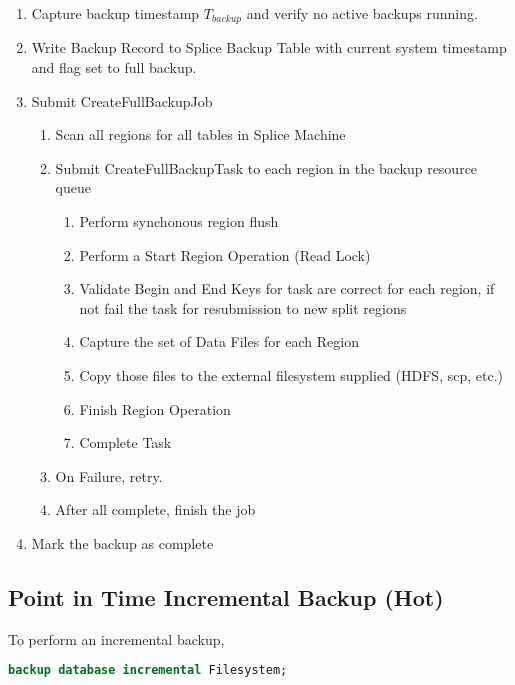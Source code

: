 \begin{enumerate}
	\item Capture backup timestamp $T_{backup}$ and verify no active backups
	running.
	\item Write Backup Record to Splice Backup Table with current system timestamp
	and flag set to full backup.
	\item Submit CreateFullBackupJob 
	\begin{enumerate}
	\item Scan all regions for all tables in Splice Machine
	\item Submit CreateFullBackupTask to each region in the backup resource queue
	\begin{enumerate}
	\item Perform synchonous region flush 
	\item Perform a Start Region Operation (Read Lock)
	\item Validate Begin and End Keys for task are correct for each region, if not
	fail the task for resubmission to new split regions
	\item Capture the set of Data Files for each Region
	\item Copy those files to the external filesystem supplied (HDFS, scp, etc.)
	\item Finish Region Operation
	\item Complete Task
	\end{enumerate}
	\item On Failure, retry.
	\item After all complete, finish the job
	\end{enumerate}
	\item Mark the backup as complete
\end{enumerate}


\subsection{Point in Time Incremental Backup (Hot)}

To perform an incremental backup,
	
\begin{lstlisting}[frame=single,captionpos=b,language=SQL,caption=Procedure to
Perform an Incremental Backup] 
backup database incremental Filesystem;
\end{lstlisting}

